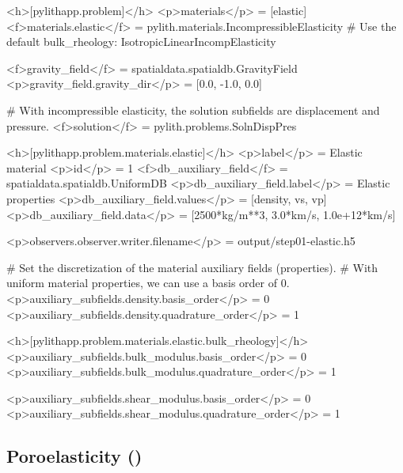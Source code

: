 \begin{cfg}
  <h>[pylithapp.problem]</h>
  <p>materials</p> = [elastic]
  <f>materials.elastic</f> = pylith.materials.IncompressibleElasticity
  # Use the default bulk_rheology: IsotropicLinearIncompElasticity

  <f>gravity_field</f> = spatialdata.spatialdb.GravityField
  <p>gravity_field.gravity_dir</p> = [0.0, -1.0, 0.0]

  # With incompressible elasticity, the solution subfields are displacement and pressure.
  <f>solution</f> = pylith.problems.SolnDispPres

    <h>[pylithapp.problem.materials.elastic]</h>
  <p>label</p> = Elastic material
  <p>id</p> = 1
  <f>db_auxiliary_field</f> = spatialdata.spatialdb.UniformDB
  <p>db_auxiliary_field.label</p> = Elastic properties
  <p>db_auxiliary_field.values</p> = [density, vs, vp]
  <p>db_auxiliary_field.data</p> = [2500*kg/m**3, 3.0*km/s, 1.0e+12*km/s]

  <p>observers.observer.writer.filename</p> = output/step01-elastic.h5

  # Set the discretization of the material auxiliary fields (properties).
  # With uniform material properties, we can use a basis order of 0.
  <p>auxiliary_subfields.density.basis_order</p> = 0
  <p>auxiliary_subfields.density.quadrature_order</p> = 1

    <h>[pylithapp.problem.materials.elastic.bulk_rheology]</h>
  <p>auxiliary_subfields.bulk_modulus.basis_order</p> = 0
  <p>auxiliary_subfields.bulk_modulus.quadrature_order</p> = 1

  <p>auxiliary_subfields.shear_modulus.basis_order</p> = 0
  <p>auxiliary_subfields.shear_modulus.quadrature_order</p> = 1
\end{cfg}

\subsection{Poroelasticity (\protect{})}

